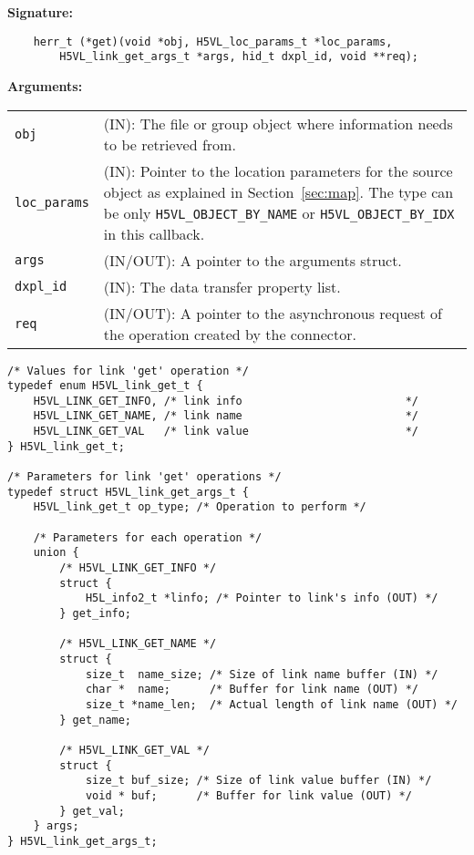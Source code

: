 \begin{mdframed}[style=bgbox]
\textbf{Signature:}
\begin{lstlisting}
    herr_t (*get)(void *obj, H5VL_loc_params_t *loc_params, 
        H5VL_link_get_args_t *args, hid_t dxpl_id, void **req);
\end{lstlisting}

\textbf{Arguments:}\\
\begin{tabular}{l p{13.5cm}}
  \texttt{obj} & (IN): The file or group object where information needs to be
  retrieved from.\\
  \texttt{loc\_params} & (IN): Pointer to the location parameters for the source
  object as explained in Section~\ref{sec:map}. The type can be only \texttt{H5VL\_OBJECT\_BY\_NAME} or \texttt{H5VL\_OBJECT\_BY\_IDX} in this
  callback.\\ 
  \texttt{args} & (IN/OUT): A pointer to the arguments struct.\\
  \texttt{dxpl\_id} & (IN): The data transfer property list.\\
  \texttt{req} & (IN/OUT): A pointer to the asynchronous request of the
  operation created by the connector.\\
\end{tabular}
\end{mdframed}

\begin{lstlisting}
/* Values for link 'get' operation */
typedef enum H5VL_link_get_t {
    H5VL_LINK_GET_INFO, /* link info                         */
    H5VL_LINK_GET_NAME, /* link name                         */
    H5VL_LINK_GET_VAL   /* link value                        */
} H5VL_link_get_t;

/* Parameters for link 'get' operations */
typedef struct H5VL_link_get_args_t {
    H5VL_link_get_t op_type; /* Operation to perform */

    /* Parameters for each operation */
    union {
        /* H5VL_LINK_GET_INFO */
        struct {
            H5L_info2_t *linfo; /* Pointer to link's info (OUT) */
        } get_info;

        /* H5VL_LINK_GET_NAME */
        struct {
            size_t  name_size; /* Size of link name buffer (IN) */
            char *  name;      /* Buffer for link name (OUT) */
            size_t *name_len;  /* Actual length of link name (OUT) */
        } get_name;

        /* H5VL_LINK_GET_VAL */
        struct {
            size_t buf_size; /* Size of link value buffer (IN) */
            void * buf;      /* Buffer for link value (OUT) */
        } get_val;
    } args;
} H5VL_link_get_args_t;
\end{lstlisting}

